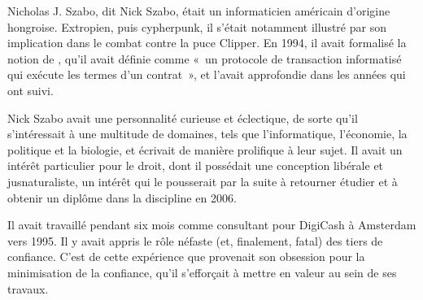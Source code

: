 Nicholas J. Szabo, dit Nick Szabo, était un informaticien américain d'origine hongroise. Extropien, puis cypherpunk, il s'était notamment illustré par son implication dans le combat contre la puce Clipper. En 1994, il avait formalisé la notion de , qu'il avait définie comme «~un protocole de transaction informatisé qui exécute les termes d'un contrat~», et l'avait approfondie dans les années qui ont suivi.  %

Nick Szabo avait une personnalité curieuse et éclectique, de sorte qu'il s'intéressait à une multitude de domaines, tels que l'informatique, l'économie, la politique et la biologie, et écrivait de manière prolifique à leur sujet. Il avait un intérêt particulier pour le droit, dont il possédait une conception libérale et jusnaturaliste, un intérêt qui le pousserait par la suite à retourner étudier et à obtenir un diplôme dans la discipline en 2006.

Il avait travaillé pendant six mois comme consultant pour DigiCash à Amsterdam vers 1995. Il y avait appris le rôle néfaste (et, finalement, fatal) des tiers de confiance. C'est de cette expérience que provenait son obsession pour la minimisation de la confiance, qu'il s'efforçait à mettre en valeur au sein de ses travaux.


